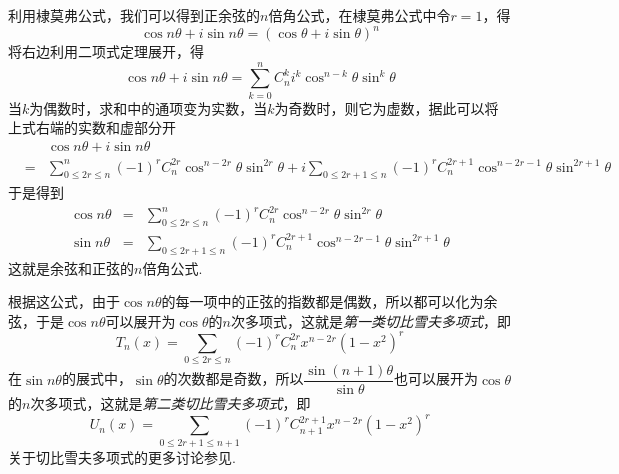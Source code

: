\begin{example}
  利用棣莫弗公式，我们可以得到正余弦的$n$倍角公式，在棣莫弗公式中令$r=1$，得
  \[ \cos{n\theta}+i\sin{n\theta} = (\cos{\theta}+i\sin{\theta})^n \]
  将右边利用二项式定理展开，得
  \[ \cos{n\theta}+i\sin{n\theta} = \sum_{k=0}^n C_n^k i^k \cos^{n-k}{\theta}\sin^k{\theta} \]
  当$k$为偶数时，求和中的通项变为实数，当$k$为奇数时，则它为虚数，据此可以将上式右端的实数和虚部分开
  \begin{eqnarray*}
   && \cos{n\theta}+i\sin{n\theta}  \\
    & = & \sum_{0 \leqslant 2r \leqslant n}^n (-1)^rC_n^{2r} \cos^{n-2r}{\theta}\sin^{2r}{\theta} + i\sum_{0 \leqslant 2r+1 \leqslant n}(-1)^rC_n^{2r+1} \cos^{n-2r-1}{\theta}\sin^{2r+1}{\theta} 
  \end{eqnarray*}
  于是得到
  \begin{eqnarray}
    \label{eq:cos-sin-of-n-theta}
    \cos{n\theta} & = & \sum_{0 \leqslant 2r \leqslant n}^n (-1)^rC_n^{2r} \cos^{n-2r}{\theta}\sin^{2r}{\theta} \\
    \sin{n\theta} & = & \sum_{0 \leqslant 2r+1 \leqslant n}(-1)^rC_n^{2r+1} \cos^{n-2r-1}{\theta}\sin^{2r+1}{\theta}
  \end{eqnarray}
  这就是余弦和正弦的$n$倍角公式.

  根据这公式，由于$\cos{n\theta}$的每一项中的正弦的指数都是偶数，所以都可以化为余弦，于是$\cos{n\theta}$可以展开为$\cos{\theta}$的$n$次多项式，这就是\emph{第一类切比雪夫多项式}，即
  \[ T_n(x) = \sum_{0 \leqslant 2r\leqslant n}(-1)^rC_n^{2r}x^{n-2r}(1-x^2)^r \]
  在$\sin{n\theta}$的展式中，$\sin{\theta}$的次数都是奇数，所以$\dfrac{\sin{(n+1)\theta}}{\sin{\theta}}$也可以展开为$\cos{\theta}$的$n$次多项式，这就是\emph{第二类切比雪夫多项式}，即
  \[ U_n(x)=\sum_{0 \leqslant 2r+1 \leqslant n+1}(-1)^rC_{n+1}^{2r+1}x^{n-2r}(1-x^2)^r \]
  关于切比雪夫多项式的更多讨论参见\cite{elementary-math-notes}.
\end{example}

